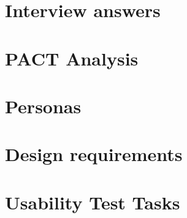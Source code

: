 \chapter{Interview answers}


\chapter{PACT Analysis}






\chapter{Personas} \label{PersonasAppendix}


\chapter{Design requirements} \label{RequirementsAppendix}





\chapter{Usability Test Tasks}
